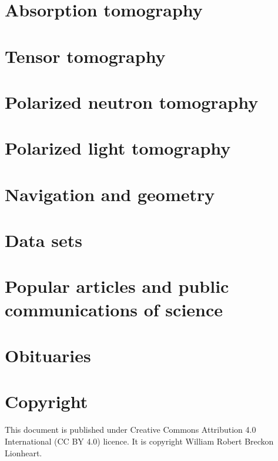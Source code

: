 \documentclass[]{article}
\begin{document}
\section{Absorption tomography}

\section{Tensor tomography}

\section{Polarized neutron tomography}

\section{Polarized light tomography}

\section{Navigation and geometry}

\section{Data sets}

\section{Popular articles and public communications of science}

\section{Obituaries}

\section*{Copyright}
This document is published under Creative Commons Attribution 4.0 International (CC BY 4.0) licence. It is copyright \textcopyright William Robert Breckon Lionheart.

{}

\end{document}
